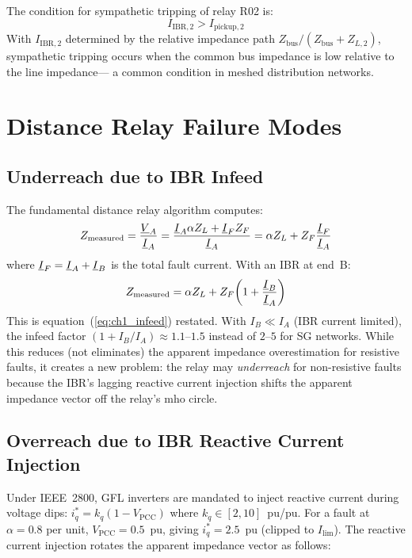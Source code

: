 The condition for sympathetic tripping of relay R02 is:
\begin{equation}
  I_\mathrm{IBR,2} > I_\mathrm{pickup,2}
  \label{eq:ch3_sympathetic_cond}
\end{equation}
With $I_\mathrm{IBR,2}$ determined by the relative impedance path
$Z_\mathrm{bus} / (Z_\mathrm{bus} + Z_{L,2})$, sympathetic tripping
occurs when the common bus impedance is low relative to the line impedance—
a common condition in meshed distribution networks.

\section{Distance Relay Failure Modes}
\label{sec:ch3_distance}

\subsection{Underreach due to IBR Infeed}

The fundamental distance relay algorithm computes:
\begin{equation}
  Z_\mathrm{measured} = \frac{\underline{V}_A}{\underline{I}_A}
  = \frac{\underline{I}_A \alpha Z_L + \underline{I}_F Z_F}{\underline{I}_A}
  = \alpha Z_L + Z_F \frac{\underline{I}_F}{\underline{I}_A}
  \label{eq:ch3_zmeas}
\end{equation}
where $\underline{I}_F = \underline{I}_A + \underline{I}_B$ is the total fault current.
With an IBR at end~B:
\begin{equation}
  Z_\mathrm{measured} = \alpha Z_L + Z_F\!\left(1 + \frac{\underline{I}_B}{\underline{I}_A}\right)
  \label{eq:ch3_infeed_eq}
\end{equation}
This is equation~(\ref{eq:ch1_infeed}) restated. With $I_B \ll I_A$
(IBR current limited), the infeed factor $(1 + I_B/I_A) \approx 1.1$--$1.5$
instead of $2$--$5$ for SG networks. While this reduces (not eliminates) the
apparent impedance overestimation for resistive faults, it creates a new
problem: the relay may \emph{underreach} for non-resistive faults because
the IBR's lagging reactive current injection shifts the apparent impedance
vector off the relay's mho circle.

\subsection{Overreach due to IBR Reactive Current Injection}

Under IEEE~2800, GFL inverters are mandated to inject reactive current
during voltage dips: $i_q^\ast = k_q (1 - V_\mathrm{PCC})$ where
$k_q \in [2, 10]$~pu/pu. For a fault at $\alpha = 0.8$ per unit,
$V_\mathrm{PCC} = 0.5$~pu, giving $i_q^\ast = 2.5$~pu (clipped to
$I_\mathrm{lim}$). The reactive current injection rotates the apparent
impedance vector as follows:

